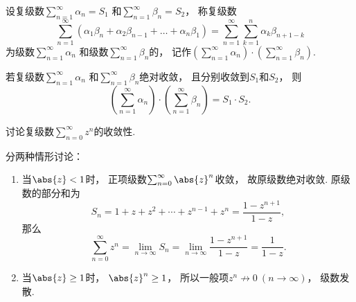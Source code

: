 \begin{definition}
设复级数\(\sum_{n=1}^\infty \alpha_n = S_1\)
和\(\sum_{n=1}^\infty \beta_n = S_2\)，
称复级数\[
	\sum_{n=1}^\infty (
		\alpha_1 \beta_n + \alpha_2 \beta_{n-1} + \dotsc + \alpha_n \beta_1
	)
	= \sum_{n=1}^\infty
		\sum_{k=1}^n \alpha_k \beta_{n+1-k}
\]为级数\(\sum_{n=1}^\infty \alpha_n\)
和级数\(\sum_{n=1}^\infty \beta_n\)的，
记作\(\left( \sum_{n=1}^\infty \alpha_n \right) \cdot \left( \sum_{n=1}^\infty \beta_n \right)\).
\end{definition}

\begin{theorem}
若复级数\(\sum_{n=1}^\infty \alpha_n\)
和\(\sum_{n=1}^\infty \beta_n\)绝对收敛，
且分别收敛到\(S_1\)和\(S_2\)，
则\[
	\left( \sum_{n=1}^\infty \alpha_n \right)
	\cdot \left( \sum_{n=1}^\infty \beta_n \right)
	= S_1 \cdot S_2.
\]
\end{theorem}

\begin{example}[复等比级数]\label{example:解析级数的级数表示.复等比级数}
讨论复级数\(\sum_{n=0}^\infty z^n\)的收敛性.
\begin{solution}
分两种情形讨论：\begin{enumerate}
	\item 当\(\abs{z} < 1\)时，
	正项级数\(\sum_{n=0}^\infty \abs{z}^n\)收敛，
	故原级数绝对收敛.
	原级数的部分和为\[
		S_n
		= 1 + z + z^2 + \dotsb + z^{n-1} + z^n
		= \frac{1-z^{n+1}}{1-z},
	\]
	那么\[
		\sum_{n=0}^\infty z^n
		= \lim_{n\to\infty} S_n
		= \lim_{n\to\infty} \frac{1-z^{n+1}}{1-z}
		= \frac{1}{1-z}.
	\]

	\item 当\(\abs{z} \geq 1\)时，
	\(\abs{z}^n \geq 1\)，
	所以一般项\(z^n \not\to 0\ (n\to\infty)\)，
	级数发散.
\end{enumerate}
\end{solution}
\end{example}
